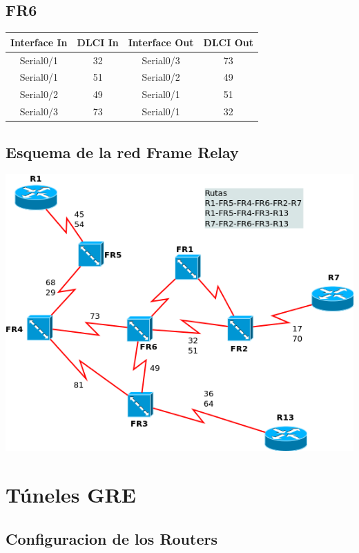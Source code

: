 \documentclass[12pt, a4paper, spanish]{article}
\begin{document}
\subsection{FR6}
\begin{center}
\begin{tabular}{|c|c|c|c|}
\hline
Interface In & DLCI In & Interface Out & DLCI Out \\
\hline
\hline
Serial0/1 & 32 & Serial0/3 & 73 \\
\hline
Serial0/1 & 51 & Serial0/2 & 49 \\
\hline
Serial0/2 & 49 & Serial0/1 & 51 \\
\hline
Serial0/3 & 73 & Serial0/1 & 32 \\
\hline
\end{tabular}
\end{center}

\newpage
\subsection{Esquema de la red Frame Relay}
\begin{center}
	\includegraphics[scale=0.70]{diagramas/Frame_Relay.png} \\
\end{center}


\newpage
\section{Túneles GRE}
\subsection{Configuracion de los Routers}
\end{document}
